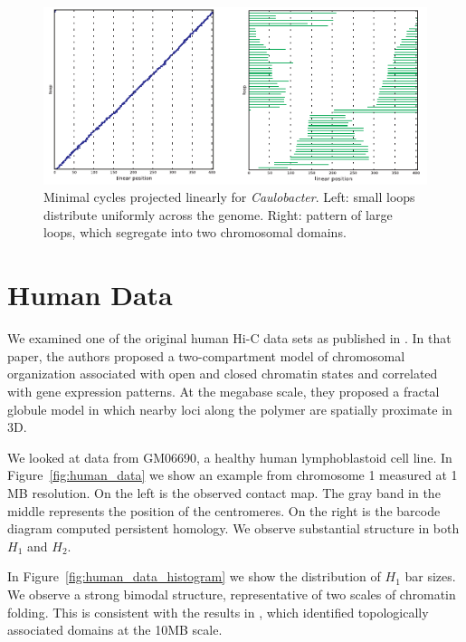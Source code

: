 \begin{figure}
       \centering
       \includegraphics[width=\columnwidth]{./fig/hic/caulobacter_localized_loops.pdf}
       \caption[Minimal Cycle Projection for \emph{Caulobacter} Hi-C Data]{Minimal cycles projected linearly for \emph{Caulobacter}. Left: small loops distribute uniformly across the genome. Right: pattern of large loops, which segregate into two chromosomal domains.}
       \label{fig:caulobacter_bar_sizes}
\end{figure}

\section{Human Data}
\label{sec:human_data}
%
We examined one of the original human Hi-C data sets as published in \cite{LiebermanAiden:2009jz}.
In that paper, the authors proposed a two-compartment model of chromosomal organization associated with open and closed chromatin states and correlated with gene expression patterns.
At the megabase scale, they proposed a fractal globule model in which nearby loci along the polymer are spatially proximate in 3D.

We looked at data from GM06690, a healthy human lymphoblastoid cell line.
In Figure~\ref{fig:human_data} we show an example from chromosome 1 measured at 1 MB resolution.
On the left is the observed contact map.
The gray band in the middle represents the position of the centromeres.
On the right is the barcode diagram computed persistent homology.
We observe substantial structure in both $H_1$ and $H_2$.

In Figure~\ref{fig:human_data_histogram} we show the distribution of $H_1$ bar sizes.
We observe a strong bimodal structure, representative of two scales of chromatin folding.
This is consistent with the results in \cite{LiebermanAiden:2009jz}, which identified topologically associated domains at the 10MB scale.

